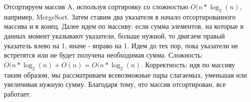\documentclass[12pt]{extreport}
\theoremstyle{definition}
\theoremstyle{definition}
\begin{document}
\Pr \hspace{1mm} Отсортируем массив A, используя сортировку со сложностью $O(n * \log_2(n)$, например, MergeSort. Затем ставим два указателя в начало отсортированного массива и в конец. Далее идем по массиву: если сумма элементов, на которые в данных момент указывают указатели, больше нужной, то двигаем правый указатель влево на 1, иначе - вправо на 1. Идем до тех пор, пока указатели не встретятся или не будет получена необходимая сумма. Сложность: $O(n * \log_2(n) + O(n) = O(n * \log_2(n)$. Корректность: идя по массиву таким образом, мы рассматриваем всевозможные пары слагаемых, уменьшая или увеличивая нужную сумму. Благодаря тому, что массив отсортирован, все работает.
\end{document}

